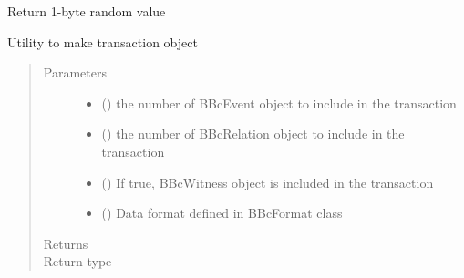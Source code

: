 \documentclass[letterpaper,10pt,english]{sphinxmanual}
\begin{document}

\begin{fulllineitems}
\label{\detokenize{bbc1.core.bbclib:bbc1.core.bbclib.get_random_value}}
Return 1-byte random value

\end{fulllineitems}


\begin{fulllineitems}
\label{\detokenize{bbc1.core.bbclib:bbc1.core.bbclib.make_transaction}}
Utility to make transaction object
\begin{quote}\begin{description}
\item[{Parameters}] \leavevmode\begin{itemize}
\item {} 
 () \textendash{} the number of BBcEvent object to include in the transaction

\item {} 
 () \textendash{} the number of BBcRelation object to include in the transaction

\item {} 
 () \textendash{} If true, BBcWitness object is included in the transaction

\item {} 
 () \textendash{} Data format defined in BBcFormat class

\end{itemize}

\item[{Returns}] \leavevmode


\item[{Return type}] \leavevmode
{\hyperref[\detokenize{bbc1.core.bbclib:bbc1.core.bbclib.BBcTransaction}]{}}

\end{description}\end{quote}

\end{fulllineitems}
\end{document}
